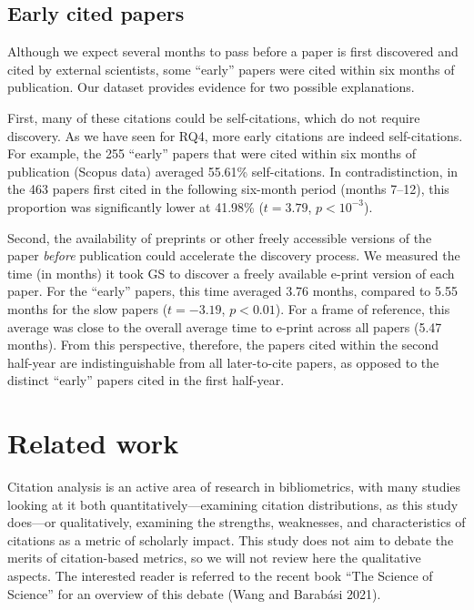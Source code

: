 \documentclass{article}
\begin{document}
\hypertarget{early-cited-papers}{%
\subsection{Early cited papers}\label{early-cited-papers}}

Although we expect several months to pass before a paper is first discovered and cited by external scientists,
some ``early'' papers were cited within six months of publication.
Our dataset provides evidence for two possible explanations.

First, many of these citations could be self-citations, which do not require discovery.
As we have seen for RQ4, more early citations are indeed self-citations.
For example, the
255
``early'' papers that were cited within six months of publication (Scopus data) averaged
55.61\%
self-citations.
In contradistinction, in the
463
papers first cited in the following six-month period (months 7--12), this proportion was significantly lower at
41.98\%
(\(t=3.79\), \(p<10^{-3}\)).

Second, the availability of preprints or other freely accessible versions of the paper \emph{before} publication could accelerate the discovery process.
We measured the time (in months) it took GS to discover a freely available e-print version of each paper.
For the ``early'' papers, this time averaged
3.76
months, compared to
5.55
months for the slow papers
(\(t=-3.19\), \(p<0.01\)).
For a frame of reference, this average was close to the overall average time to e-print across all papers
(5.47 months).
From this perspective, therefore,
the papers cited within the second half-year are indistinguishable from all later-to-cite papers, as opposed to the distinct ``early'' papers cited in the first half-year.

\hypertarget{sec:related}{%
\section{Related work}\label{sec:related}}

Citation analysis is an active area of research in bibliometrics, with many studies looking at it both quantitatively---examining citation distributions, as this study does---or qualitatively, examining the strengths, weaknesses, and characteristics of citations as a metric of scholarly impact.
This study does not aim to debate the merits of citation-based metrics, so we will not review here the qualitative aspects.
The interested reader is referred to the recent book ``The Science of Science'' for an overview of this debate (Wang and Barabási 2021).
\end{document}

